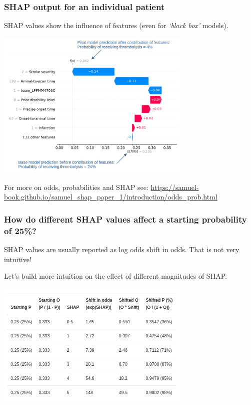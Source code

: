 \documentclass[xcolor={usenames,dvipsnames}]{beamer}
\newcommand{\smallurl}[1]{\textcolor{blue}{\fontsize{4pt}{4.8pt}\selectfont \url{#1}}}
\begin{document}
\begin{frame}
\frametitle{SHAP output for an individual patient}

\footnotesize{SHAP values show the influence of features (even for \emph{`black box'} models).}

\begin{center} 
\includegraphics[width=0.7\textwidth]{./images/shap_output_for_individual_patient}
\end{center}


{\tiny For more on odds, probabilities and SHAP see: }
\smallurl{https://samuel-book.github.io/samuel_shap_paper_1/introduction/odds_prob.html}


\end{frame}






\begin{frame}
\frametitle{How do different SHAP values affect a starting probability of 25\%?}


SHAP values are usually reported as log odds shift in odds. That is not very intuitive! 

\vspace{0.5em}
Let’s build more intuition on the effect of different magnitudes of SHAP.

\begin{center}
\includegraphics[width=0.7\textwidth]{./images/shap_affect_probability}
\end{center} 

\end{frame}
\end{document}
